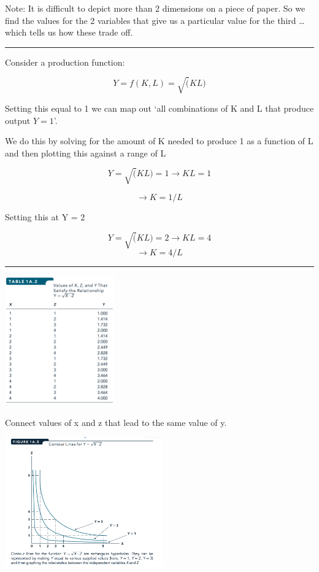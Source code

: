 \documentclass[]{article}
\begin{document}
Note: It is difficult to depict more than 2 dimensions on a piece of paper. So we find the values for the 2 variables that give us a particular value for the third \ldots{} which tells us how these trade off.

\begin{center}\rule{0.5\linewidth}{\linethickness}\end{center}

Consider a production function:

\[Y = f(K,L) = \sqrt(KL)\]

\bigskip

Setting this equal to 1 we can map out `all combinations of K and L that produce output \(Y=1\)'.

We do this by solving for the amount of K needed to produce 1 as a function of L
and then plotting this against a range of L

\bigskip

\[  Y = \sqrt(KL) = 1 \rightarrow KL = 1 \]

\bigskip

\[ \rightarrow K = 1/L \]

\bigskip

Setting this at Y = 2

\[  Y = \sqrt(KL) = 2 \rightarrow KL = 4 \]
\[ \rightarrow K = 4/L \]

\begin{center}\rule{0.5\linewidth}{\linethickness}\end{center}

\includegraphics[height=2.2in]{picsfigs/contourcombos.png}

Connect values of x and z that lead to the same value of y.

\includegraphics[height=2.2in]{picsfigs/contourlines_example.png}
\end{document}
